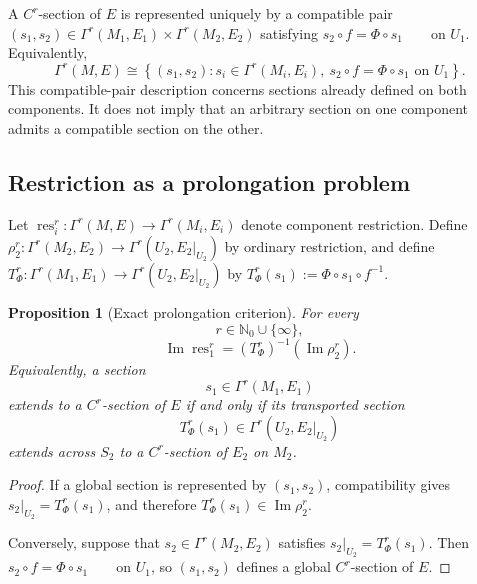 \documentclass[11pt]{article}
\theoremstyle{plain}
\newtheorem{proposition}[theorem]{Proposition}
\theoremstyle{definition}
\begin{document}
A \(C^r\)-section of \(E\) is represented uniquely by a compatible
pair \((s_1,s_2) \in \Gamma^r(M_1,E_1) \times \Gamma^r(M_2,E_2)\) satisfying
\(s_2\circ f=\Phi\circ s_1 \qquad \text{on }U_1\).
Equivalently,
\[
  \Gamma^r(M,E)
  \cong
  \left\{
    (s_1,s_2):
    s_i\in\Gamma^r(M_i,E_i),\
    s_2\circ f=\Phi\circ s_1
    \text{ on }U_1
  \right\}.
\]
This compatible-pair description concerns sections already defined on
both components. It does not imply that an arbitrary section on one
component admits a compatible section on the other.

\subsection{Restriction as a prolongation problem}
\label{subsec:exact-prolongation}

Let \(\operatorname{res}_i^r: \Gamma^r(M,E) \longrightarrow \Gamma^r(M_i,E_i)\) denote component restriction. Define \(\rho_2^r: \Gamma^r(M_2,E_2) \longrightarrow \Gamma^r(U_2,E_2|_{U_2})\) by ordinary restriction, and define \(T_\Phi^r: \Gamma^r(M_1,E_1) \longrightarrow \Gamma^r(U_2,E_2|_{U_2})\) by
\(T_\Phi^r(s_1) := \Phi\circ s_1\circ f^{-1}\).

\begin{proposition}[Exact prolongation criterion]
\label{prop:exact-prolongation}
For every
\[
  r\in\mathbb N_0\cup\{\infty\},
\]
\[
  \operatorname{Im}\operatorname{res}_1^r
  =
  \left(T_\Phi^r\right)^{-1}
  \left(
    \operatorname{Im}\rho_2^r
  \right).
\]
Equivalently, a section
\[
  s_1\in\Gamma^r(M_1,E_1)
\]
extends to a \(C^r\)-section of \(E\) if and only if its transported
section
\[
  T_\Phi^r(s_1)
  \in
  \Gamma^r(U_2,E_2|_{U_2})
\]
extends across \(S_2\) to a \(C^r\)-section of \(E_2\) on \(M_2\).
\end{proposition}

\begin{proof}
If a global section is represented by \((s_1,s_2)\), compatibility
gives
\(s_2|_{U_2}=T_\Phi^r(s_1)\),
and therefore
\(T_\Phi^r(s_1)\in\operatorname{Im}\rho_2^r\).

Conversely, suppose that \(s_2\in\Gamma^r(M_2,E_2)\) satisfies
\(s_2|_{U_2}=T_\Phi^r(s_1)\).
Then
\(s_2\circ f=\Phi\circ s_1 \qquad \text{on }U_1\),
so \((s_1,s_2)\) defines a global \(C^r\)-section of \(E\).
\end{proof}
\end{document}
